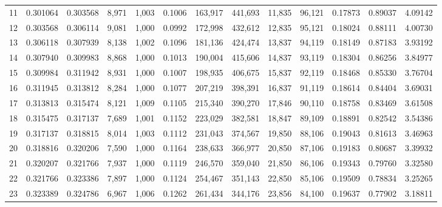 \begin{tabular}{rrrrrrrrrrrrr}
11  &  0.301064 &  0.303568 &   8,971 &  1,003 &                                     0.1006 &  163,917 &  441,693 &   11,835 &   96,121 &  0.17873 &  0.89037 &  4.09142 \\
12  &  0.303568 &  0.306114 &   9,081 &  1,000 &                                     0.0992 &  172,998 &  432,612 &   12,835 &   95,121 &  0.18024 &  0.88111 &  4.00730 \\
13  &  0.306118 &  0.307939 &   8,138 &  1,002 &                                     0.1096 &  181,136 &  424,474 &   13,837 &   94,119 &  0.18149 &  0.87183 &  3.93192 \\
14  &  0.307940 &  0.309983 &   8,868 &  1,000 &                                     0.1013 &  190,004 &  415,606 &   14,837 &   93,119 &  0.18304 &  0.86256 &  3.84977 \\
15  &  0.309984 &  0.311942 &   8,931 &  1,000 &                                     0.1007 &  198,935 &  406,675 &   15,837 &   92,119 &  0.18468 &  0.85330 &  3.76704 \\
16  &  0.311945 &  0.313812 &   8,284 &  1,000 &                                     0.1077 &  207,219 &  398,391 &   16,837 &   91,119 &  0.18614 &  0.84404 &  3.69031 \\
17  &  0.313813 &  0.315474 &   8,121 &  1,009 &                                     0.1105 &  215,340 &  390,270 &   17,846 &   90,110 &  0.18758 &  0.83469 &  3.61508 \\
18  &  0.315475 &  0.317137 &   7,689 &  1,001 &                                     0.1152 &  223,029 &  382,581 &   18,847 &   89,109 &  0.18891 &  0.82542 &  3.54386 \\
19  &  0.317137 &  0.318815 &   8,014 &  1,003 &                                     0.1112 &  231,043 &  374,567 &   19,850 &   88,106 &  0.19043 &  0.81613 &  3.46963 \\
20  &  0.318816 &  0.320206 &   7,590 &  1,000 &                                     0.1164 &  238,633 &  366,977 &   20,850 &   87,106 &  0.19183 &  0.80687 &  3.39932 \\
21  &  0.320207 &  0.321766 &   7,937 &  1,000 &                                     0.1119 &  246,570 &  359,040 &   21,850 &   86,106 &  0.19343 &  0.79760 &  3.32580 \\
22  &  0.321766 &  0.323386 &   7,897 &  1,000 &                                     0.1124 &  254,467 &  351,143 &   22,850 &   85,106 &  0.19509 &  0.78834 &  3.25265 \\
23  &  0.323389 &  0.324786 &   6,967 &  1,006 &                                     0.1262 &  261,434 &  344,176 &   23,856 &   84,100 &  0.19637 &  0.77902 &  3.18811 \\

\end{tabular}
